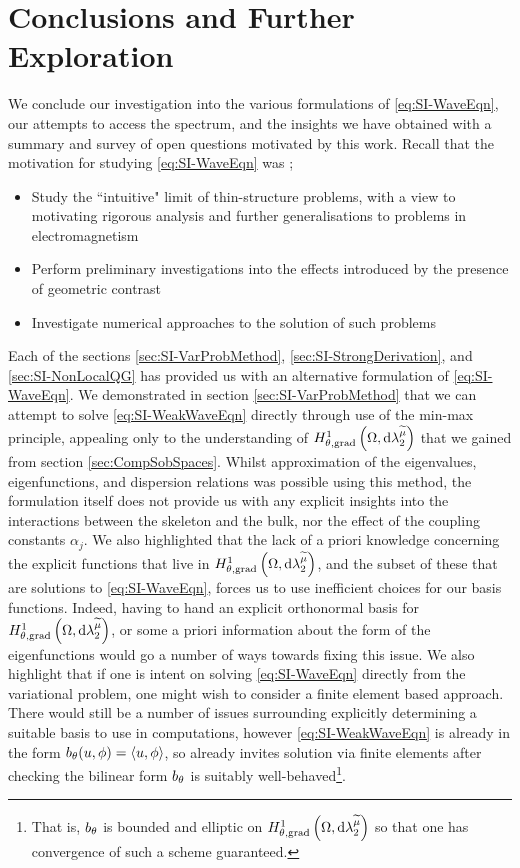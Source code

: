 \section{Conclusions and Further Exploration} \label{sec:SI-Conc}
We conclude our investigation into the various formulations of \eqref{eq:SI-WaveEqn}, our attempts to access the spectrum, and the insights we have obtained with a summary and survey of open questions motivated by this work.
Recall that the motivation for studying \eqref{eq:SI-WaveEqn} was ;
\begin{itemize}
	\item Study the ``intuitive" limit of thin-structure problems, with a view to motivating rigorous analysis and further generalisations to problems in electromagnetism
	\item Perform preliminary investigations into the effects introduced by the presence of geometric contrast
	\item Investigate numerical approaches to the solution of such problems
\end{itemize} 

Each of the sections \ref{sec:SI-VarProbMethod}, \ref{sec:SI-StrongDerivation}, and \ref{sec:SI-NonLocalQG} has provided us with an alternative formulation of \eqref{eq:SI-WaveEqn}.
We demonstrated in section \ref{sec:SI-VarProbMethod} that we can attempt to solve \eqref{eq:SI-WeakWaveEqn} directly through use of the min-max principle, appealing only to the understanding of $H^1_{\theta, \mathrm{grad}}\left( \Omega, \mathrm{d}\lambda_2^{\widetilde{\mu}} \right)$ that we gained from section \ref{sec:CompSobSpaces}.
Whilst approximation of the eigenvalues, eigenfunctions, and dispersion relations was possible using this method, the formulation itself does not provide us with any explicit insights into the interactions between the skeleton and the bulk, nor the effect of the coupling constants $\alpha_j$.
We also highlighted that the lack of a priori knowledge concerning the explicit functions that live in $H^1_{\theta, \mathrm{grad}}\left( \Omega, \mathrm{d}\lambda_2^{\widetilde{\mu}} \right)$, and the subset of these that are solutions to \eqref{eq:SI-WaveEqn}, forces us to use inefficient choices for our basis functions.
Indeed, having to hand an explicit orthonormal basis for $H^1_{\theta, \mathrm{grad}}\left( \Omega, \mathrm{d}\lambda_2^{\widetilde{\mu}} \right)$, or some a priori information about the form of the eigenfunctions would go a number of ways towards fixing this issue.
We also highlight that if one is intent on solving \eqref{eq:SI-WaveEqn} directly from the variational problem, one might wish to consider a finite element based approach.
There would still be a number of issues surrounding explicitly determining a suitable basis to use in computations, however \eqref{eq:SI-WeakWaveEqn} is already in the form $b_{\theta}(u,\phi)=\left\langle u , \phi \right\rangle$, so already invites solution via finite elements after checking the bilinear form $b_{\theta}$ is suitably well-behaved\footnote{That is, $b_{\theta}$ is bounded and elliptic on $H^1_{\theta, \mathrm{grad}}\left( \Omega, \mathrm{d}\lambda_2^{\widetilde{\mu}} \right)$ so that one has convergence of such a scheme guaranteed.}.


